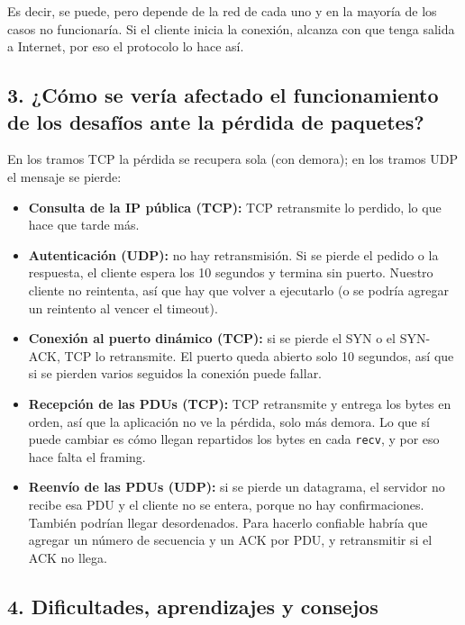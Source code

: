 \documentclass[11pt,a4paper]{article}
\begin{document}
Es decir, se puede, pero depende de la red de cada uno y en la mayoría de los casos no funcionaría. Si el cliente inicia la conexión, alcanza con que tenga salida a Internet, por eso el protocolo lo hace así.

\subsection*{3. ¿Cómo se vería afectado el funcionamiento de los desafíos ante la pérdida de paquetes?}

En los tramos TCP la pérdida se recupera sola (con demora); en los tramos UDP el mensaje se pierde:

\begin{itemize}
  \item \textbf{Consulta de la IP pública (TCP):} TCP retransmite lo perdido, lo que hace que tarde más.
  \item \textbf{Autenticación (UDP):} no hay retransmisión. Si se pierde el pedido o la respuesta, el cliente espera los 10 segundos y termina sin puerto. Nuestro cliente no reintenta, así que hay que volver a ejecutarlo (o se podría agregar un reintento al vencer el timeout).
  \item \textbf{Conexión al puerto dinámico (TCP):} si se pierde el SYN o el SYN-ACK, TCP lo retransmite. El puerto queda abierto solo 10 segundos, así que si se pierden varios seguidos la conexión puede fallar.
  \item \textbf{Recepción de las PDUs (TCP):} TCP retransmite y entrega los bytes en orden, así que la aplicación no ve la pérdida, solo más demora. Lo que sí puede cambiar es cómo llegan repartidos los bytes en cada \texttt{recv}, y por eso hace falta el framing.
  \item \textbf{Reenvío de las PDUs (UDP):} si se pierde un datagrama, el servidor no recibe esa PDU y el cliente no se entera, porque no hay confirmaciones. También podrían llegar desordenados. Para hacerlo confiable habría que agregar un número de secuencia y un ACK por PDU, y retransmitir si el ACK no llega.
\end{itemize}

\subsection*{4. Dificultades, aprendizajes y consejos}

\end{document}
